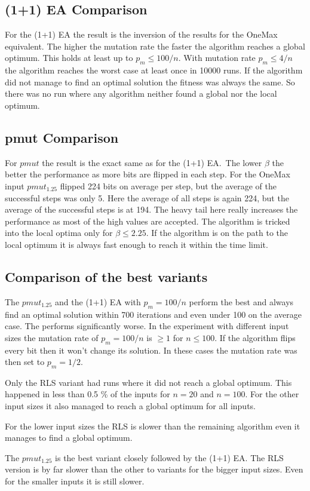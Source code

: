 \subsection{(1+1) EA Comparison}


For the (1+1) EA the result is the inversion of the results for the OneMax equivalent.
The higher the mutation rate the faster the algorithm reaches a global optimum.
This holds at least up to $p_m\le100/n$.
With mutation rate $p_m\le4/n$ the algorithm reaches the worst case at least once in 10000 runs.
If the algorithm did not manage to find an optimal solution the fitness was always the same.
So there was no run where any algorithm neither found a global nor the local optimum.
\subsection{pmut Comparison}


For $pmut$ the result is the exact same as for the (1+1) EA.\ 
The lower $\beta$ the better the performance as more bits are flipped in each step.
For the OneMax input $pmut_{1.25}$ flipped 224 bits on average per step, but the average of the successful steps was only 5.
Here the average of all steps is again 224, but the average of the successful steps is at 194.
The heavy tail here really increases the performance as most of the high values are accepted.
The algorithm is tricked into the local optima only for $\beta\le2.25$.
If the algorithm is on the path to the local optimum it is always fast enough to reach it within the time limit.
\subsection{Comparison of the best variants}
% 
% 
The $pmut_{1.25}$ and the (1+1) EA with $p_m=100/n$ perform the best and always find an optimal solution within 700 iterations and even under 100 on the average case.
The \RLSN[4] performs significantly worse.
In the experiment with different input sizes the mutation rate of $p_m=100/n$ is $\ge1$ for $n\le100$.
If the algorithm flips every bit then it won't change its solution.
In these cases the mutation rate was then set to $p_m=1/2$.



Only the RLS variant had runs where it did not reach a global optimum.
This happened in less than 0.5 \% of the inputs for $n=20$ and $n=100$.
For the other input sizes it also managed to reach a global optimum for all inputs.



For the lower input sizes the RLS is slower than the remaining algorithm even it manages to find a global optimum.



The $pmut_{1.25}$ is the best variant closely followed by the (1+1) EA.
The RLS version is by far slower than the other to variants for the bigger input sizes.
Even for the smaller inputs it is still slower.
